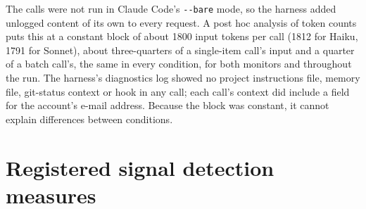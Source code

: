 \documentclass[manuscript, screen, review]{jair}
\newcommand{\code}[1]{\texttt{#1}}
\begin{document}
The calls were not run in Claude Code's \code{-{}-bare} mode, so the harness added unlogged content of its own to every request. A post hoc analysis of token counts puts this at a constant block of about \num{1800} input tokens per call (\num{1812} for Haiku, \num{1791} for Sonnet), about three-quarters of a single-item call's input and a quarter of a batch call's, the same in every condition, for both monitors and throughout the run. The harness's diagnostics log showed no project instructions file, memory file, git-status context or hook in any call; each call's context did include a field for the account's e-mail address. Because the block was constant, it cannot explain differences between conditions.

\section{Registered signal detection measures}\label{app:sdt}
\end{document}
